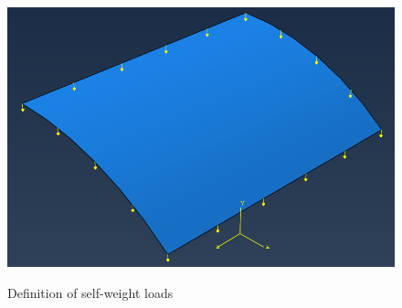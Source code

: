 \documentclass[english,a4paper,12pt]{article}
\begin{document}
\begin{figure}[h!tp]
{\includegraphics[scale=0.3]{capturas/20-load.png}}
\caption{Definition of self-weight loads}
\label{fig:pp}
\end{figure}
\end{document}
